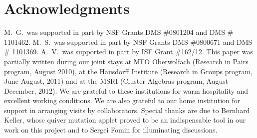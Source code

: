 \documentclass{amsart}
\theoremstyle{definition}
\theoremstyle{remark}
\numberwithin{equation}{section}
\numberwithin{theorem}{section}
\begin{document}
\section*{Acknowledgments}
 M.~G.~was supported in part by NSF Grants DMS \#0801204 and  DMS \# 1101462. 
M.~S.~was supported in part by NSF Grants DMS \#0800671 and DMS \# 1101369.  
A.~V.~was supported in part by ISF Grant \#162/12. This paper was partially written during
our joint stays at MFO Oberwolfach (Research in Pairs program, August 2010), at the Hausdorff Institute
(Research in Groups program, June-August, 2011) and at the MSRI (Cluster Algebras program, August-December, 2012). We are grateful to these institutions for
warm hospitality and excellent working conditions. We are also grateful to our home institution for support in arranging visits by collaborators.
Special thanks are due to Bernhard Keller, whose quiver mutation applet proved to be an indispensable tool in our work on this project and to Sergei Fomin for illuminating discussions.
\end{document}
